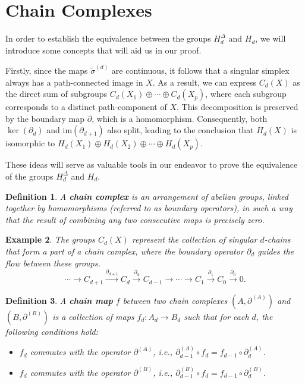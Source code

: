 \documentclass{amsart}
\newtheorem{definition}{Definition}[section]
\newtheorem{example}[definition]{Example}
\begin{document}
\section{Chain Complexes}
In order to establish the equivalence between the groups $H_d^\Delta$ and $H_d$, we will introduce some concepts that will aid us in our proof.

Firstly, since the maps $\tilde{\sigma}^{(d)}$ are continuous, it follows that a singular simplex always has a path-connected image in $X$. As a result, we can express $C_d(X)$ as the direct sum of subgroups $C_d(X_1) \oplus \cdots \oplus C_d(X_p)$, where each subgroup corresponds to a distinct path-component of $X$. This decomposition is preserved by the boundary map $\partial$, which is a homomorphism. Consequently, both $\ker(\partial_d)$ and $\text{im}(\partial_{d+1})$ also split, leading to the conclusion that $H_d(X)$ is isomorphic to $H_d(X_1) \oplus H_d(X_2) \oplus \cdots \oplus H_d(X_p)$.

These ideas will serve as valuable tools in our endeavor to prove the equivalence of the groups $H_d^\Delta$ and $H_d$.

\begin{definition}
A \textbf{chain complex} is an arrangement of abelian groups, linked together by homomorphisms (referred to as boundary operators), in such a way that the result of combining any two consecutive maps is precisely zero.
\end{definition}

\begin{example}
The groups $C_d(X)$ represent the collection of singular $d$-chains that form a part of a chain complex, where the boundary operator $\partial_d$ guides the flow between these groups.
\begin{equation}
\cdots \xrightarrow{} C_{d+1} \xrightarrow{\partial_{d+1}} C_d \xrightarrow{\partial_d} C_{d-1} \xrightarrow{} \cdots \xrightarrow{} C_1 \xrightarrow{\partial_1} C_0 \xrightarrow{\partial_0} 0.
\end{equation}
\end{example}

\begin{definition}
A \textbf{chain map} $f$ between two chain complexes $(A, \partial^{(A)})$ and $(B,\partial^{(B)})$ is a collection of maps $f_d: A_d \rightarrow B_d$ such that for each $d$, the following conditions hold:
\begin{itemize}
    \item $f_d$ commutes with the operator $\partial^{(A)}$, i.e., $\partial^{(A)}_{d-1} \circ f_d = f_{d-1} \circ \partial^{(A)}_d$.
    \item $f_d$ commutes with the operator $\partial^{(B)}$, i.e., $\partial^{(B)}_{d-1} \circ f_d = f_{d-1} \circ \partial^{(B)}_d$.
\end{itemize}
\end{definition}
\end{document}
